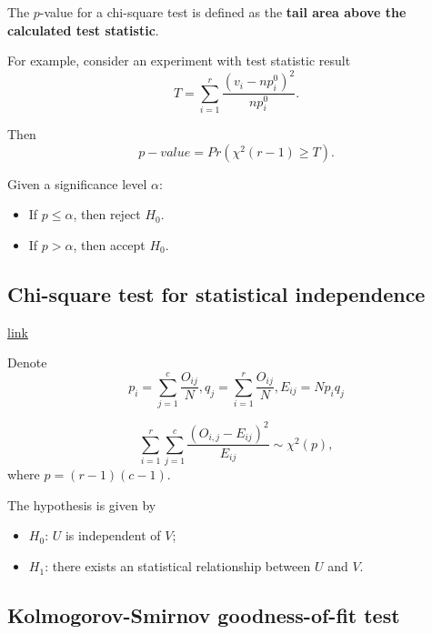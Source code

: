 \begin{refsection}
\begin{note}
The $p$-value for a chi-square test is defined as the \textbf{tail area above the calculated test statistic}.

For example, consider an experiment with test statistic result
$$ T = \sum_{i=1}^r \frac{(v_i - np_i^0)^2}{np_i^0}.$$

Then $$p-value = Pr(\chi^2(r-1)\geq T).$$

	Given a significance level $\alpha$:
	\begin{itemize}
		\item If $p \leq \alpha$, then reject $H_0$.
		\item If $p > \alpha$, then accept $H_0$.
	\end{itemize} 	
\end{note}

\subsection{Chi-square test for statistical independence}

\begin{lemma}\href{https://en.wikipedia.org/wiki/Pearson%27s_chi-squared_test}{link}
	




Denote
$$p_i = \sum_{j=1}^{c}\frac{O_{ij}}{N}, q_j = \sum_{i=1}^{r}\frac{O_{ij}}{N}, E_{ij} = Np_iq_j$$
	
	$$\sum_{i=1}^{r}\sum_{j=1}^{c}\frac{(O_{i,j} - E_{ij})^2}{E_{ij}}\sim \chi^2(p),$$
	where $p = (r- 1)(c-1)$.
	
The hypothesis is given by
\begin{itemize}
	\item $H_0$: $U$ is independent of $V$;
	\item $H_1$: there exists an statistical relationship between $U$ and $V$.
\end{itemize}	
	
\end{lemma}

\subsection{Kolmogorov-Smirnov goodness-of-fit test}





\end{refsection}
